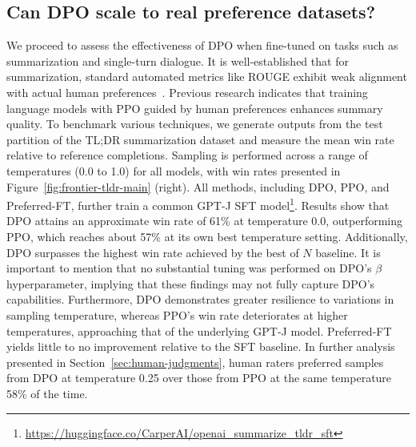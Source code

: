 \subsection{Can DPO scale to real preference datasets?}
\label{sec:dpo-real-datasets}
We proceed to assess the effectiveness of DPO when fine-tuned on tasks such as summarization and single-turn dialogue. It is well-established that for summarization, standard automated metrics like ROUGE exhibit weak alignment with actual human preferences~\citep{stiennon2022learning}. Previous research indicates that training language models with PPO guided by human preferences enhances summary quality. To benchmark various techniques, we generate outputs from the test partition of the TL;DR summarization dataset and measure the mean win rate relative to reference completions. Sampling is performed across a range of temperatures (0.0 to 1.0) for all models, with win rates presented in Figure~\ref{fig:frontier-tldr-main} (right). All methods, including DPO, PPO, and Preferred-FT, further train a common GPT-J SFT model\footnote{\url{https://huggingface.co/CarperAI/openai_summarize_tldr_sft}}. Results show that DPO attains an approximate win rate of 61\% at temperature 0.0, outperforming PPO, which reaches about 57\% at its own best temperature setting. Additionally, DPO surpasses the highest win rate achieved by the best of $N$ baseline. It is important to mention that no substantial tuning was performed on DPO's $\beta$ hyperparameter, implying that these findings may not fully capture DPO’s capabilities. Furthermore, DPO demonstrates greater resilience to variations in sampling temperature, whereas PPO’s win rate deteriorates at higher temperatures, approaching that of the underlying GPT-J model. Preferred-FT yields little to no improvement relative to the SFT baseline. In further analysis presented in Section~\ref{sec:human-judgments}, human raters preferred samples from DPO at temperature 0.25 over those from PPO at the same temperature 58\% of the time.

